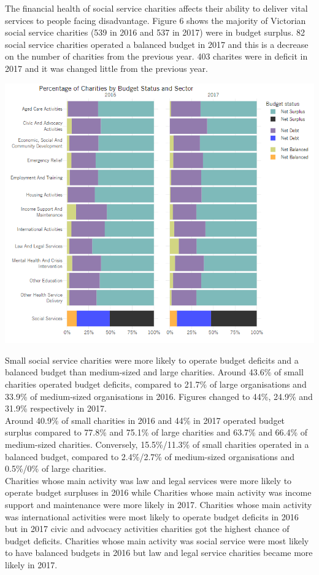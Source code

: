 \documentclass[
  11pt,
]{article}
\let\origfigure\figure
\let\endorigfigure\endfigure
\renewenvironment{figure}[1][2] {
    \expandafter\origfigure\expandafter[H]
} {
    \endorigfigure
}
\begin{document}
The financial health of social service charities affects their ability to deliver vital services to people facing disadvantage. Figure 6 shows the majority of Victorian social service charities (539 in 2016 and 537 in 2017) were in budget surplus. 82 social service charities operated a balanced budget in 2017 and this is a decrease on the number of charities from the previous year. 403 charites were in deficit in 2017 and it was changed little from the previous year.

\begin{figure}
\centering
\includegraphics{Fig6 Budget Status props.PNG}
\caption{Budget status per Main Activity}
\end{figure}

Small social service charities were more likely to operate budget deficits and a balanced budget than medium-sized and large charities. Around 43.6\% of small charities operated budget deficits, compared to 21.7\% of large organisations and 33.9\% of medium-sized organisations in 2016. Figures changed to 44\%, 24.9\% and 31.9\% respectively in 2017.\\
Around 40.9\% of small charities in 2016 and 44\% in 2017 operated budget surplus compared to 77.8\% and 75.1\% of large charities and 63.7\% and 66.4\% of medium-sized charities. Conversely, 15.5\%/11.3\% of small charities operated in a balanced budget, compared to 2.4\%/2.7\% of medium-sized organisations and 0.5\%/0\% of large charities.\\
Charities whose main activity was law and legal services were more likely to operate budget surpluses in 2016 while Charities whose main activity was income support and maintenance were more likely in 2017. Charities whose main activity was international activities were most likely to operate budget deficits in 2016 but in 2017 civic and advocacy activities charities got the highest chance of budget deficits. Charities whose main activity was social service were most likely to have balanced budgets in 2016 but law and legal service charities became more likely in 2017.
\end{document}
